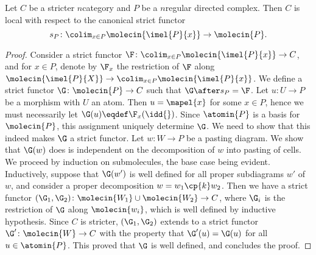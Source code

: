 \begin{lem} \label{lem:local_wrt_directed_complexes}
    Let \( C \) be a stricter \( n \)\nbd category and \( P \) be a \( n \)\nbd regular directed complex.
    Then \( C \) is local with respect to the canonical strict functor 
    \begin{equation*}
        s_P \colon \colim_{x \in P} \molecin{\imel{P}{x}} \to \molecin{P}.
    \end{equation*}
\end{lem}
\begin{proof}
    Consider a strict functor \( \F \colon \colim_{x \in P} \molecin{\imel{P}{x}} \to C \), and for \( x \in P \), denote by \( \F_x \) the restriction of \( \F \) along \( \molecin{\imel{P}{X}} \to \colim_{x \in P} \molecin{\imel{P}{x}} \).
    We define a strict functor \( \G \colon \molecin{P} \to C \) such that \( \G \after s_P = \F \).
    Let \( u \colon U \to P \) be a morphism with \( U \) an atom.
    Then \( u = \mapel{x} \) for some \( x \in P \), hence we must necessarily let \( \G(u) \eqdef \F_x(\idd{}) \).
    Since \( \atomin{P} \) is a basis for \( \molecin{P} \), this assignment uniquely determine \( \G \).
    We need to show that this indeed makes \( \G \) a strict functor.
    Let \( w \colon W \to P \) be a pasting diagram.
    We show that \( \G(w) \) does is independent on the decomposition of \( w \) into pasting of cells. 
    We proceed by induction on submolecules, the base case being evident.
    Inductively, suppose that \( \G(w') \) is well defined for all proper subdiagrams \( w' \) of \( w \), and consider a proper decomposition \( w = w_1 \cp{k} w_2 \).
    Then we have a strict functor \( (\G_1, \G_2) \colon \molecin{W_1} \cup \molecin{W_2} \to C \), where \( \G_i \) is the restriction of \( \G \) along \( \molecin{w_i} \), which is well defined by inductive hypothesis. 
    Since \( C \) is stricter, \( (\G_1, \G_2) \) extends to a strict functor \( \G' \colon \molecin{W} \to C \) with the property that \( \G'(u) = \G(u) \) for all \( u \in \atomin{P} \).
    This proved that \( \G \) is well defined, and concludes the proof. 
\end{proof}



